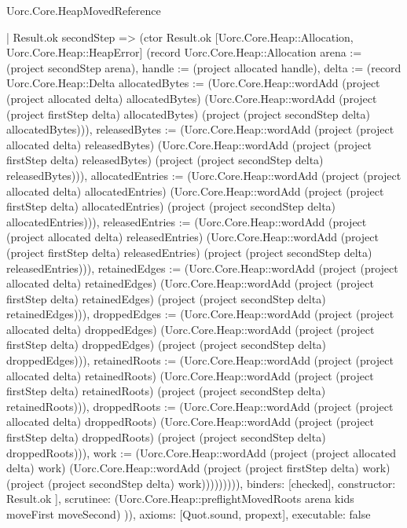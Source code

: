 \begin{lexlean}{Uorc.Core.HeapMovedReference}
\begin{semanticmodule}
{{{              | Result.ok secondStep => (ctor Result.ok [Uorc.Core.Heap::Allocation, Uorc.Core.Heap::HeapError] (record Uorc.Core.Heap::Allocation {arena := (project secondStep arena), handle := (project allocated handle), delta := (record Uorc.Core.Heap::Delta {allocatedBytes := (Uorc.Core.Heap::wordAdd (project (project allocated delta) allocatedBytes) (Uorc.Core.Heap::wordAdd (project (project firstStep delta) allocatedBytes) (project (project secondStep delta) allocatedBytes))), releasedBytes := (Uorc.Core.Heap::wordAdd (project (project allocated delta) releasedBytes) (Uorc.Core.Heap::wordAdd (project (project firstStep delta) releasedBytes) (project (project secondStep delta) releasedBytes))), allocatedEntries := (Uorc.Core.Heap::wordAdd (project (project allocated delta) allocatedEntries) (Uorc.Core.Heap::wordAdd (project (project firstStep delta) allocatedEntries) (project (project secondStep delta) allocatedEntries))), releasedEntries := (Uorc.Core.Heap::wordAdd (project (project allocated delta) releasedEntries) (Uorc.Core.Heap::wordAdd (project (project firstStep delta) releasedEntries) (project (project secondStep delta) releasedEntries))), retainedEdges := (Uorc.Core.Heap::wordAdd (project (project allocated delta) retainedEdges) (Uorc.Core.Heap::wordAdd (project (project firstStep delta) retainedEdges) (project (project secondStep delta) retainedEdges))), droppedEdges := (Uorc.Core.Heap::wordAdd (project (project allocated delta) droppedEdges) (Uorc.Core.Heap::wordAdd (project (project firstStep delta) droppedEdges) (project (project secondStep delta) droppedEdges))), retainedRoots := (Uorc.Core.Heap::wordAdd (project (project allocated delta) retainedRoots) (Uorc.Core.Heap::wordAdd (project (project firstStep delta) retainedRoots) (project (project secondStep delta) retainedRoots))), droppedRoots := (Uorc.Core.Heap::wordAdd (project (project allocated delta) droppedRoots) (Uorc.Core.Heap::wordAdd (project (project firstStep delta) droppedRoots) (project (project secondStep delta) droppedRoots))), work := (Uorc.Core.Heap::wordAdd (project (project allocated delta) work) (Uorc.Core.Heap::wordAdd (project (project firstStep delta) work) (project (project secondStep delta) work)))})}))))),
        binders: [checked],
        constructor: Result.ok
      }
    ],
    scrutinee: (Uorc.Core.Heap::preflightMovedRoots arena kids moveFirst moveSecond)
  })),
  axioms: [Quot.sound, propext],
  executable: false
}


\end{semanticmodule}
\end{lexlean}

